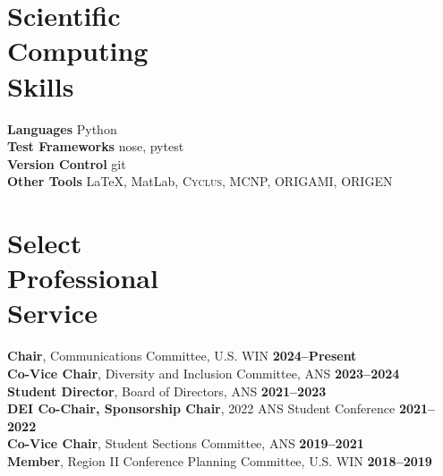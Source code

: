 \documentclass[margin,line]{resume}
\newcommand{\Cyclus}{\textsc{Cyclus}\xspace}%
\begin{document}
\begin{resume}
    \section{\mysidestyle Scientific\\Computing\\Skills}
                \textbf{Languages} \hfill Python\vspace{.5mm}\\%
                \textbf{Test Frameworks} \hfill nose, pytest\vspace{.5mm}\\%
                \textbf{Version Control} \hfill git\vspace{.5mm}\\%
                \textbf{Other Tools} \hfill \LaTeX, MatLab, \Cyclus, MCNP, ORIGAMI, ORIGEN\vspace{.5mm}%
        \vspace{-3mm}

    \section{\mysidestyle Select\\Professional\\Service}
        \textbf{Chair}, Communications Committee, U.S. WIN  \hfill \textbf{2024--Present}\\%
        \textbf{Co-Vice Chair}, Diversity and Inclusion Committee, ANS  \hfill \textbf{2023--2024}\vspace{.5mm}\\%
        \textbf{Student Director}, Board of Directors, ANS \hfill \textbf{2021--2023}\vspace{.5mm}\\%
        \textbf{DEI Co-Chair, Sponsorship Chair}, 2022 ANS Student Conference \hfill \textbf{2021--2022}\vspace{.5mm}\\%
        \textbf{Co-Vice Chair}, Student Sections Committee, ANS \hfill \textbf{2019--2021}\\
        \textbf{Member}, Region II Conference Planning Committee, U.S. WIN  \hfill \textbf{2018--2019}\vspace{0mm}\\%



\end{resume}
\end{document}
